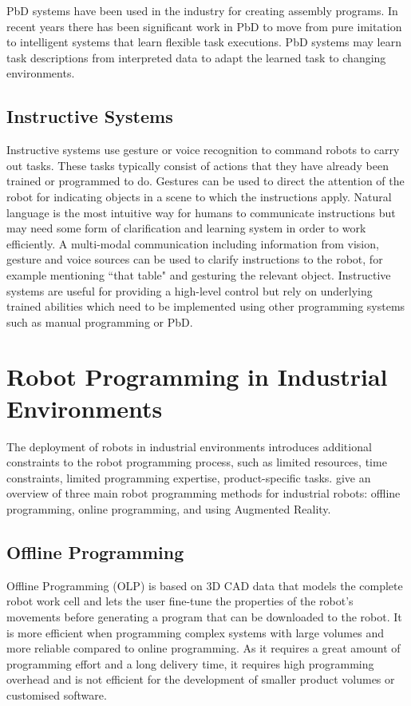 PbD systems have been used in the industry for creating assembly programs. 
In recent years there has been significant work in PbD to move from pure imitation to intelligent systems that learn flexible task executions. 
PbD systems may learn task descriptions from interpreted data to adapt the learned task to changing environments.

\subsection{Instructive Systems}%
Instructive systems use gesture or voice recognition to command robots to carry out tasks.
These tasks typically consist of actions that they have already been trained or programmed to do. 
Gestures can be used to direct the attention of the robot for indicating objects in a scene to which the instructions apply. 
Natural language is the most intuitive way for humans to communicate instructions but may need some form of clarification and learning system in order to work efficiently. 
A multi-modal communication including information from vision, gesture and voice sources can be used to clarify instructions to the robot, for example mentioning ``that table" and gesturing the relevant object.
Instructive systems are useful for providing a high-level control but rely on underlying trained abilities which need to be implemented using other programming systems such as manual programming or PbD.


\section{Robot Programming in Industrial Environments}\label{subsec:RP in Industrial Enviroments}
The deployment of robots in industrial environments introduces additional constraints to the robot programming process, such as limited resources, time constraints, limited programming expertise, product-specific tasks.
 give an overview of three main robot programming methods for industrial robots: offline programming, online programming, and using Augmented Reality. 

\subsection{Offline Programming}\label{sssec:Offline Programming}
Offline Programming (OLP) is based on 3D CAD data that models the complete robot work cell and lets the user fine-tune the properties of the robot's movements before generating a program that can be downloaded to the robot. 
It is more efficient when programming complex systems with large volumes and more reliable compared to online programming. 
As it requires a great amount of programming effort and a long delivery time, it requires high programming overhead and is not efficient for the development of smaller product volumes or customised software.

